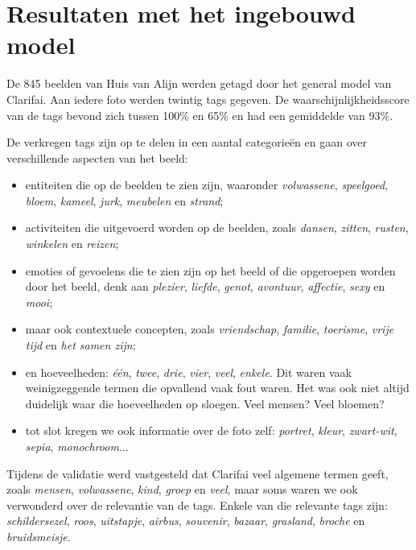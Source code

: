 \chapter{Resultaten met het ingebouwd model}
\label{ch:resultaten-ingebouwd-model}

De 845 beelden van Huis van Alijn werden getagd door het general model van Clarifai. Aan iedere foto werden twintig tags gegeven. De waarschijnlijkheidsscore van de tags bevond zich tussen 100\% en 65\% en had een gemiddelde van 93\%. 

De verkregen tags zijn op te delen in een aantal categorieën en gaan over verschillende aspecten van het beeld:
\begin{itemize}
	\item entiteiten die op de beelden te zien zijn, waaronder \textit{volwassene}, \textit{speelgoed}, \textit{bloem}, \textit{kameel}, \textit{jurk}, \textit{meubelen} en \textit{strand};
	\item activiteiten die uitgevoerd worden op de beelden, zoals \textit{dansen}, \textit{zitten}, \textit{rusten}, \textit{winkelen} en \textit{reizen};
	\item emoties of gevoelens die te zien zijn op het beeld of die opgeroepen worden door het beeld, denk aan \textit{plezier}, \textit{liefde}, \textit{genot}, \textit{avontuur}, \textit{affectie}, \textit{sexy} en \textit{mooi};
	\item maar ook contextuele concepten, zoals \textit{vriendschap}, \textit{familie}, \textit{toerisme}, \textit{vrije tijd} en \textit{het samen zijn};
	\item en hoeveelheden: \textit{één}, \textit{twee}, \textit{drie}, \textit{vier}, \textit{veel}, \textit{enkele}. Dit waren vaak weinigzeggende termen die opvallend vaak fout waren. Het was ook niet altijd duidelijk waar die hoeveelheden op sloegen. Veel mensen? Veel bloemen?
	\item tot slot kregen we ook informatie over de foto zelf: \textit{portret}, \textit{kleur}, \textit{zwart-wit}, \textit{sepia}, \textit{monochroom}...
\end{itemize}

Tijdens de validatie werd vastgesteld dat Clarifai veel algemene termen geeft, zoals \textit{mensen}, \textit{volwassene}, \textit{kind}, \textit{groep} en \textit{veel}, maar soms waren we ook verwonderd over de relevantie van de tags. Enkele van die relevante tags zijn: \textit{schildersezel}, \textit{roos}, \textit{uitstapje}, \textit{airbus}, \textit{souvenir}, \textit{bazaar}, \textit{grasland}, \textit{broche} en \textit{bruidsmeisje}. 

